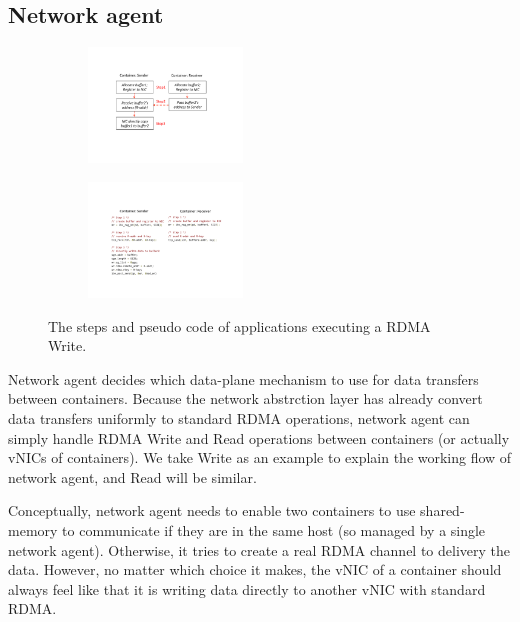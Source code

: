 \subsection{Network agent}

     \begin{figure}[t!]
     \centering 
     \begin{subfigure}
     \centering 
     \includegraphics[width=0.45\textwidth]{figures/system/sys_rdma_steps.pdf}
     \end{subfigure}
           
     \begin{subfigure}
     \centering 
     \includegraphics[width=0.45\textwidth]{figures/system/sys_rdma_code.pdf}      
     \end{subfigure}
     \label{fig:sys_rdma_steps_code}
     \caption{The steps and pseudo code of applications executing a RDMA Write.} 
     \end{figure}

Network agent decides which data-plane mechanism to use for data transfers
between containers. Because the network abstrction layer has already convert
data transfers uniformly to standard RDMA operations, network agent can simply
handle RDMA Write and Read operations between containers (or actually vNICs
of containers). We take Write as an example to explain the working flow of
network agent, and Read will be similar.

Conceptually, network agent needs to enable two containers to use shared-memory
to communicate if they are in the same host (so managed by a single network
agent). Otherwise, it tries to create a real RDMA channel to delivery the data.
However, no matter which choice it makes, the vNIC of a container should always
feel like that it is writing data directly to another vNIC with standard RDMA.

